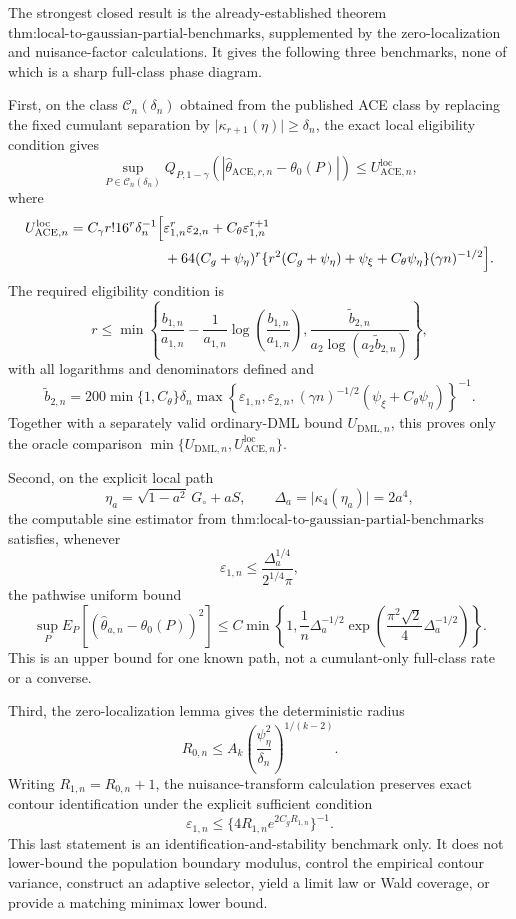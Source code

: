 The strongest closed result is the already-established theorem
\(\text{thm:local-to-gaussian-partial-benchmarks}\), supplemented by the
zero-localization and nuisance-factor calculations.  It gives the following
three benchmarks, none of which is a sharp full-class phase diagram.

First, on the class \(\mathcal C_n(\delta_n)\) obtained from the published
ACE class by replacing the fixed cumulant separation by
\(\lvert\kappa_{r+1}(\eta)\rvert\geq\delta_n\), the exact local eligibility
condition gives
\[
 \sup_{P\in\mathcal C_n(\delta_n)}
 Q_{P,1-\gamma}
 \!\left(
   \left|\widehat\theta_{\mathrm{ACE},r,n}-\theta_0(P)\right|
 \right)
 \leq U_{\mathrm{ACE},n}^{\mathrm{loc}},
\]
where
\[
\begin{aligned}
 U_{\mathrm{ACE},n}^{\mathrm{loc}}
 &=C_{\gamma}r!16^r\delta_n^{-1}
 \Bigl[
   \varepsilon_{1,n}^r\varepsilon_{2,n}
   +C_{\theta}\varepsilon_{1,n}^{r+1}\\
 &\hspace{24mm}
   +64(C_g+\psi_{\eta})^r
    \{r^2(C_g+\psi_{\eta})+\psi_{\xi}+C_{\theta}\psi_{\eta}\}
    (\gamma n)^{-1/2}
 \Bigr].
\end{aligned}
\]
The required eligibility condition is
\[
 r\leq
 \min\!\left\{
   \frac{b_{1,n}}{a_{1,n}}
   -\frac{1}{a_{1,n}}
       \log\!\left(\frac{b_{1,n}}{a_{1,n}}\right),
   \frac{\widetilde b_{2,n}}
        {a_2\log(a_2\widetilde b_{2,n})}
 \right\},
\]
with all logarithms and denominators defined and
\[
 \widetilde b_{2,n}
 =200\min\{1,C_{\theta}\}\delta_n
 \max\!\left\{
   \varepsilon_{1,n},\varepsilon_{2,n},
   (\gamma n)^{-1/2}(\psi_{\xi}+C_{\theta}\psi_{\eta})
 \right\}^{-1}.
\]
Together with a separately valid ordinary-DML bound
\(U_{\mathrm{DML},n}\), this proves only the oracle comparison
\(\min\{U_{\mathrm{DML},n},U_{\mathrm{ACE},n}^{\mathrm{loc}}\}\).

Second, on the explicit local path
\[
 \eta_a=\sqrt{1-a^2}\,G_{\circ}+aS,
 \qquad
 \Delta_a=\lvert\kappa_4(\eta_a)\rvert=2a^4,
\]
the computable sine estimator from
\(\text{thm:local-to-gaussian-partial-benchmarks}\) satisfies, whenever
\[
 \varepsilon_{1,n}
 \leq\frac{\Delta_a^{1/4}}{2^{1/4}\pi},
\]
the pathwise uniform bound
\[
 \sup_P E_P\!\left[
   (\widehat\theta_{a,n}-\theta_0(P))^2
 \right]
 \leq
 C\min\!\left\{
  1,\frac{1}{n}\Delta_a^{-1/2}
  \exp\!\left(
    \frac{\pi^2\sqrt2}{4}\Delta_a^{-1/2}
  \right)
 \right\}.
\]
This is an upper bound for one known path, not a cumulant-only full-class
rate or a converse.

Third, the zero-localization lemma gives the deterministic radius
\[
 R_{0,n}
 \leq A_k
 \left(\frac{\psi_{\eta}^2}{\delta_n}\right)^{1/(k-2)}.
\]
Writing \(R_{1,n}=R_{0,n}+1\), the nuisance-transform calculation preserves
exact contour identification under the explicit sufficient condition
\[
 \varepsilon_{1,n}
 \leq
 \{4R_{1,n}e^{2C_gR_{1,n}}\}^{-1}.
\]
This last statement is an identification-and-stability benchmark only.  It
does not lower-bound the population boundary modulus, control the empirical
contour variance, construct an adaptive selector, yield a limit law or Wald
coverage, or provide a matching minimax lower bound.